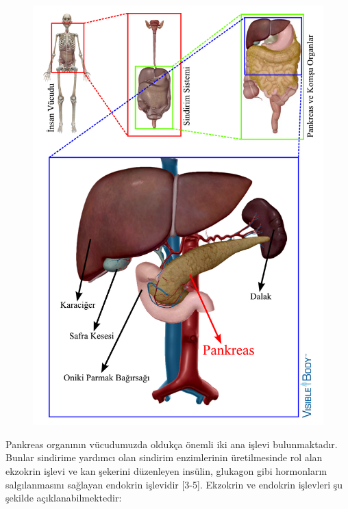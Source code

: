 \begin{figure}[h!]
	\begin{center}
		\vspace{0.4cm}
		{
		    \vspace{0.1cm}
			\includegraphics[scale=0.66]{Genel-Bilgiler/Figures/pankreas_location.pdf}
		}
	\end{center}
\end{figure}

Pankreas organının vücudumuzda oldukça önemli iki ana işlevi bulunmaktadır. Bunlar sindirime yardımcı olan sindirim enzimlerinin üretilmesinde rol alan ekzokrin işlevi ve kan şekerini düzenleyen insülin, glukagon gibi hormonların salgılanmasını sağlayan endokrin işlevidir [3-5]. Ekzokrin ve endokrin işlevleri şu şekilde açıklanabilmektedir:

